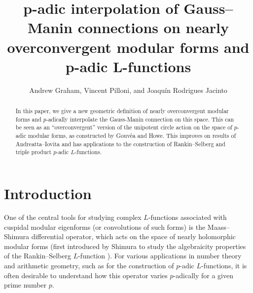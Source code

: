 \documentclass[10pt, oneside]{amsart}
\title[ ]{p-adic interpolation of Gauss--Manin connections on nearly overconvergent modular forms and p-adic L-functions}
\author{Andrew Graham, Vincent Pilloni, and Joaquín Rodrigues Jacinto}
\numberwithin{equation}{subsection}
\theoremstyle{definition}
\theoremstyle{remark}
\begin{document}
\makeatletter
\def\@tocline#1#2#3#4#5#6#7{\relax
  \ifnum #1>\c@tocdepth %
  \else
    \par \addpenalty\@secpenalty\addvspace{#2}%
    \begingroup \hyphenpenalty\@M
    \@ifempty{#4}{%
      \@tempdima\csname r@tocindent\number#1\endcsname\relax
    }{%
      \@tempdima#4\relax
    }%
    \parindent\z@ \leftskip#3\relax \advance\leftskip\@tempdima\relax
    \rightskip\@pnumwidth plus4em \parfillskip-\@pnumwidth
    #5\leavevmode\hskip-\@tempdima
      \ifcase #1
       \or\or \hskip 1em \or \hskip 2em \else \hskip 3em \fi%
      #6\nobreak\relax
    \dotfill\hbox to\@pnumwidth{\@tocpagenum{#7}}\par
    \nobreak
    \endgroup
  \fi}
\makeatother



\begin{abstract}
In this paper, we give a new geometric definition of nearly overconvergent modular forms and $p$-adically interpolate the Gauss-Manin connection on this space. This can be seen as an ``overconvergent'' version of the unipotent circle action on the space of $p$-adic modular forms, as constructed by Gouv\^{e}a and Howe. This improves on results of Andreatta--Iovita and has applications to the construction of Rankin--Selberg and triple product $p$-adic $L$-functions.
\end{abstract}

\maketitle
\tableofcontents

\section{Introduction}

One of the central tools for studying complex $L$-functions associated with cuspidal modular eigenforms (or convolutions of such forms) is the Maass--Shimura differential operator, which acts on the space of nearly holomorphic modular forms (first introduced by Shimura to study the algebraicity properties of the Rankin--Selberg $L$-function \cite{Shimura76, Shimura86}). For various applications in number theory and arithmetic geometry, such as for the construction of $p$-adic $L$-functions, it is often desirable to understand how this operator varies $p$-adically for a given prime number $p$.
\end{document}

